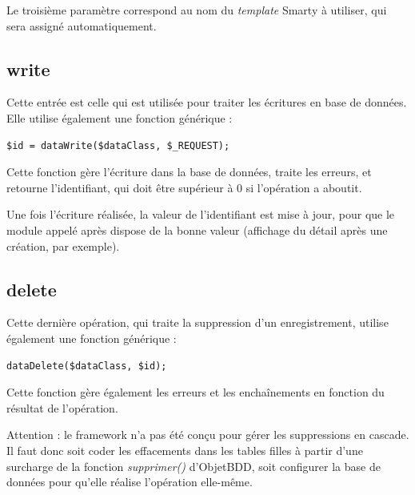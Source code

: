 Le troisième paramètre correspond au nom du \textit{template} Smarty à utiliser, qui sera assigné automatiquement.

\subsection{write}
Cette entrée est celle qui est utilisée pour traiter les écritures en base de données. Elle utilise également une fonction générique : 
\begin{lstlisting}
$id = dataWrite($dataClass, $_REQUEST);
\end{lstlisting}

Cette fonction gère l'écriture dans la base de données, traite les erreurs, et retourne l'identifiant, qui doit être supérieur à 0 si l'opération a aboutit.

Une fois l'écriture réalisée, la valeur de l'identifiant est mise à jour, pour que le module appelé après dispose de la bonne valeur (affichage du détail après une création, par exemple).

\subsection{delete}
Cette dernière opération, qui traite la suppression d'un enregistrement, utilise également une fonction générique :

\begin{lstlisting}
dataDelete($dataClass, $id);
\end{lstlisting}

Cette fonction gère également les erreurs et les enchaînements en fonction du résultat de l'opération.

Attention : le framework n'a pas été conçu pour gérer les suppressions en cascade. Il faut donc soit coder les effacements dans les tables filles à partir d'une surcharge de la fonction \textit{supprimer()} d'ObjetBDD, soit configurer la base de données pour qu'elle réalise l'opération elle-même.